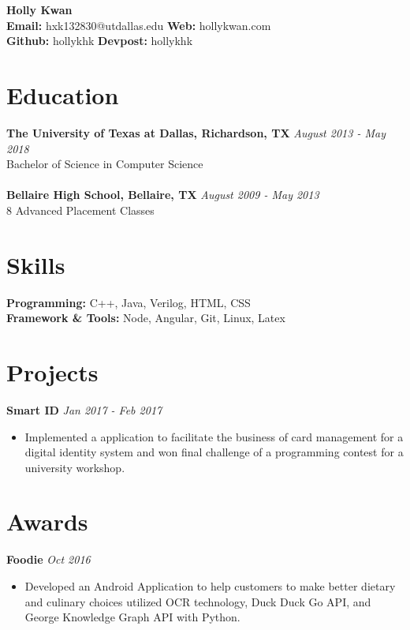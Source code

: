 \documentclass[10pt,a4paper,sans]{article}
\author{Holly Kwan}
\renewcommand\maketitle{}
\begin{document}
\begin{center}
\fontsize{10}{12}
{\textbf {Holly Kwan} \\
\textbf {Email:} hxk132830@utdallas.edu \textbf {Web:} hollykwan.com  }\\ 
\textbf {Github:} hollykhk \textbf {Devpost:} hollykhk \\
\end{center}
\maketitle
\section{Education}
{\bf The University of Texas at Dallas, Richardson, TX} \hfill {\em August 2013 - May 2018} 
\\ Bachelor of Science in Computer Science\hfill {  }
\\
\\{\bf Bellaire High School, Bellaire, TX} \hfill {\em August 2009 - May 2013} 
\\ 8 Advanced Placement Classes\hfill {  }
\section{Skills}
\textbf{Programming:} C++, Java, Verilog, HTML, CSS \\
\textbf{Framework \& Tools:} Node, Angular, Git, Linux, Latex 
\section{Projects}
{\bf Smart ID} \hfill {\em Jan 2017 - Feb 2017}
\begin{itemize}
    \item Implemented a application to facilitate the business of card management for a digital identity system and won final challenge of a programming contest for a university workshop.
\end{itemize}
\section{Awards}
{\bf Foodie} \hfill {\em Oct 2016}
\begin{itemize}
    \item Developed an Android Application to help customers to make better dietary and culinary choices utilized OCR technology, Duck Duck Go API, and George Knowledge Graph API with Python. 
\end{itemize}
\end{document}
